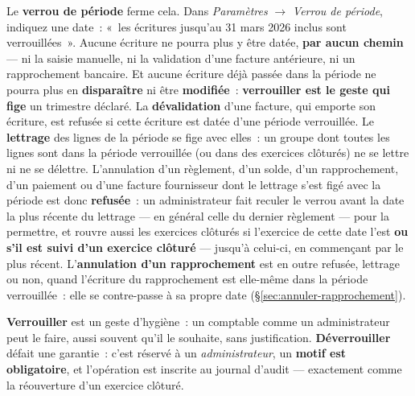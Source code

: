 \documentclass[a4paper,11pt,oneside]{article}
\begin{document}
Le \textbf{verrou de période} ferme cela. Dans \emph{Paramètres} $\rightarrow$ \emph{Verrou de
période}, indiquez une date~: «~les écritures jusqu'au 31 mars 2026 inclus sont verrouillées~». Aucune écriture ne pourra plus y être datée, \textbf{par aucun chemin} ---
ni la saisie manuelle, ni la validation d'une facture antérieure, ni un rapprochement bancaire.
Et aucune écriture déjà passée dans la période ne pourra plus en \textbf{disparaître} ni
être \textbf{modifiée}~: \textbf{verrouiller est le geste qui fige} un trimestre déclaré. La
\textbf{dévalidation} d'une facture, qui emporte son écriture, est refusée si cette écriture est
datée d'une période verrouillée.
Le \textbf{lettrage} des lignes de la période se fige avec elles~: un groupe dont toutes les
lignes sont dans la période verrouillée (ou dans des exercices clôturés) ne se lettre ni ne se
délettre. L'annulation d'un règlement, d'un solde, d'un rapprochement, d'un paiement ou d'une
facture fournisseur dont le lettrage s'est figé avec la période est donc \textbf{refusée}~: un
administrateur fait reculer le verrou avant la date la plus récente du lettrage --- en général
celle du dernier règlement --- pour la permettre, et rouvre aussi les exercices clôturés si
l'exercice de cette date l'est \textbf{ou s'il est suivi d'un exercice clôturé} --- jusqu'à
celui-ci, en commençant par le plus récent. L'\textbf{annulation d'un rapprochement} est en
outre refusée, lettrage ou non, quand l'écriture du rapprochement est elle-même dans la période
verrouillée~: elle se contre-passe à sa propre date (\S\ref{sec:annuler-rapprochement}).

\begin{keshtip}[title={\faLightbulb\ Deux gestes, deux exigences différentes}]
\textbf{Verrouiller} est un geste d'hygiène~: un comptable comme un administrateur peut le
faire, aussi souvent qu'il le souhaite, sans justification. \textbf{Déverrouiller} défait une
garantie~: c'est réservé à un \emph{administrateur}, un \textbf{motif est obligatoire}, et
l'opération est inscrite au journal d'audit --- exactement comme la réouverture d'un exercice
clôturé.
\end{keshtip}
\end{document}
